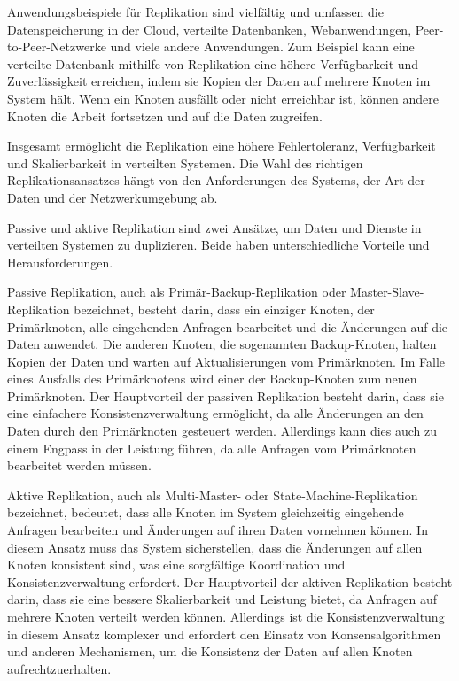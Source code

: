 Anwendungsbeispiele für Replikation sind vielfältig und umfassen die Datenspeicherung in der Cloud, verteilte Datenbanken, Webanwendungen, Peer-to-Peer-Netzwerke und viele andere Anwendungen. Zum Beispiel kann eine verteilte Datenbank mithilfe von Replikation eine höhere Verfügbarkeit und Zuverlässigkeit erreichen, indem sie Kopien der Daten auf mehrere Knoten im System hält. Wenn ein Knoten ausfällt oder nicht erreichbar ist, können andere Knoten die Arbeit fortsetzen und auf die Daten zugreifen.

Insgesamt ermöglicht die Replikation eine höhere Fehlertoleranz, Verfügbarkeit und Skalierbarkeit in verteilten Systemen. Die Wahl des richtigen Replikationsansatzes hängt von den Anforderungen des Systems, der Art der Daten und der Netzwerkumgebung ab.

Passive und aktive Replikation sind zwei Ansätze, um Daten und Dienste in verteilten Systemen zu duplizieren. Beide haben unterschiedliche Vorteile und Herausforderungen.

Passive Replikation, auch als Primär-Backup-Replikation oder Master-Slave-Replikation bezeichnet, besteht darin, dass ein einziger Knoten, der Primärknoten, alle eingehenden Anfragen bearbeitet und die Änderungen auf die Daten anwendet. Die anderen Knoten, die sogenannten Backup-Knoten, halten Kopien der Daten und warten auf Aktualisierungen vom Primärknoten. Im Falle eines Ausfalls des Primärknotens wird einer der Backup-Knoten zum neuen Primärknoten. Der Hauptvorteil der passiven Replikation besteht darin, dass sie eine einfachere Konsistenzverwaltung ermöglicht, da alle Änderungen an den Daten durch den Primärknoten gesteuert werden. Allerdings kann dies auch zu einem Engpass in der Leistung führen, da alle Anfragen vom Primärknoten bearbeitet werden müssen.

Aktive Replikation, auch als Multi-Master- oder State-Machine-Replikation bezeichnet, bedeutet, dass alle Knoten im System gleichzeitig eingehende Anfragen bearbeiten und Änderungen auf ihren Daten vornehmen können. In diesem Ansatz muss das System sicherstellen, dass die Änderungen auf allen Knoten konsistent sind, was eine sorgfältige Koordination und Konsistenzverwaltung erfordert. Der Hauptvorteil der aktiven Replikation besteht darin, dass sie eine bessere Skalierbarkeit und Leistung bietet, da Anfragen auf mehrere Knoten verteilt werden können. Allerdings ist die Konsistenzverwaltung in diesem Ansatz komplexer und erfordert den Einsatz von Konsensalgorithmen und anderen Mechanismen, um die Konsistenz der Daten auf allen Knoten aufrechtzuerhalten.

